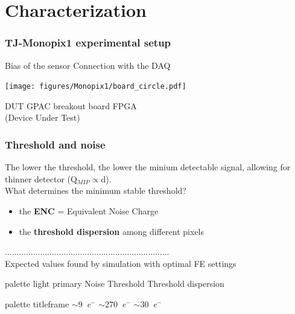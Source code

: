 \section{Characterization}
    \begin{frame}
        \frametitle{TJ-Monopix1 experimental setup}
            Bias of the sensor\hspace{80pt} Connection with the DAQ
            \begin{center}
                \centering \texttt{[image: figures/Monopix1/board\_circle.pdf]}
            \end{center}
            \hspace{15pt}DUT \hspace{45pt}GPAC breakout board \hspace{25pt} FPGA\\
            \footnotesize(Device Under Test)
    \end{frame} 



    \begin{frame}
        \frametitle{Threshold and noise}\medskip
        The lower the threshold, the lower the minium detectable signal, allowing for thinner detector (Q$_{MIP}\propto$d). \\
        \medskip
        What determines the minimum stable threshold?
        \begin{itemize}
            \item the \textbf{ENC} = Equivalent Noise Charge
            \item the \textbf{threshold dispersion} among different pixels
        \end{itemize}
        \medskip
        \centering ......................................................................\\\medskip
        \centering Expected values found by simulation with optimal FE settings %
        \begin{center}
        \begin{beamercolorbox}[rounded=true, center]{palette light primary}
            Noise \hspace*{1.2cm} Threshold \hspace*{1.2cm} Threshold dispersion
        \end{beamercolorbox}
        \begin{beamercolorbox}[rounded=true, center]{palette titleframe}
            \hspace*{-2.4cm} $\sim$\SI{9}{\elementarycharge}$^-$ \hspace*{1.4cm} $\sim$\SI{270}{\elementarycharge}$^-$ \hspace*{1.2cm} $\sim$\SI{30}{\elementarycharge}$^-$
        \end{beamercolorbox}
    \end{center}
    \end{frame}


